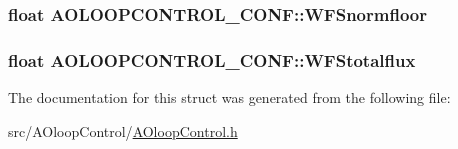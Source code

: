 \hypertarget{structAOLOOPCONTROL__CONF_abd08de6307435bc1a73849ae8f784169}{
\subsubsection[{W\+F\+Snormfloor}]{\setlength{\rightskip}{0pt plus 5cm}float A\+O\+L\+O\+O\+P\+C\+O\+N\+T\+R\+O\+L\+\_\+\+C\+O\+N\+F\+::\+W\+F\+Snormfloor}}\label{structAOLOOPCONTROL__CONF_abd08de6307435bc1a73849ae8f784169}
\hypertarget{structAOLOOPCONTROL__CONF_ab19e1ec513dfe03aef82717b63466374}{
\subsubsection[{W\+F\+Stotalflux}]{\setlength{\rightskip}{0pt plus 5cm}float A\+O\+L\+O\+O\+P\+C\+O\+N\+T\+R\+O\+L\+\_\+\+C\+O\+N\+F\+::\+W\+F\+Stotalflux}}\label{structAOLOOPCONTROL__CONF_ab19e1ec513dfe03aef82717b63466374}


The documentation for this struct was generated from the following file\+:\begin{DoxyCompactItemize}
\item 
src/\+A\+Oloop\+Control/\hyperlink{AOloopControl_8h}{A\+Oloop\+Control.\+h}\end{DoxyCompactItemize}
